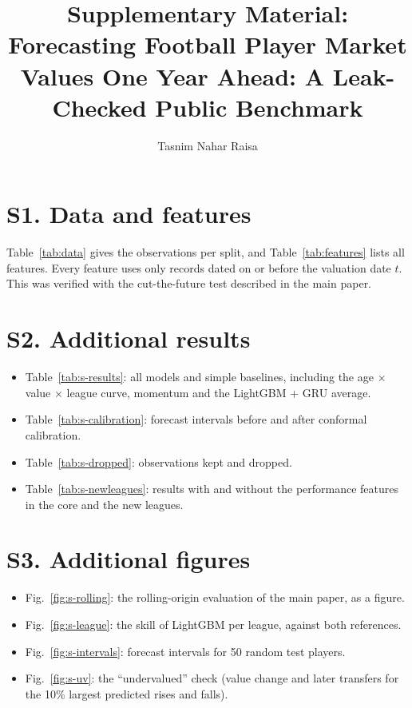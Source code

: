 \documentclass[conference,onecolumn]{IEEEtran}
\begin{document}
\title{Supplementary Material: Forecasting Football Player Market Values One Year Ahead: A Leak-Checked Public Benchmark}
\author{\ifanonymous\else Tasnim Nahar Raisa\fi}
\maketitle

\section*{S1. Data and features}
Table~\ref{tab:data} gives the observations per split, and Table~\ref{tab:features} lists all \NFeatures{} features. Every feature uses only records dated on or before the valuation date $t$. This was verified with the cut-the-future test described in the main paper.



\clearpage
\section*{S2. Additional results}
\begin{itemize}
\item Table~\ref{tab:s-results}: all models and simple baselines, including the age $\times$ value $\times$ league curve, momentum and the LightGBM + GRU average.
\item Table~\ref{tab:s-calibration}: forecast intervals before and after conformal calibration.
\item Table~\ref{tab:s-dropped}: observations kept and dropped.
\item Table~\ref{tab:s-newleagues}: results with and without the performance features in the core and the new leagues.
\end{itemize}





\clearpage
\section*{S3. Additional figures}
\begin{itemize}
\item Fig.~\ref{fig:s-rolling}: the rolling-origin evaluation of the main paper, as a figure.
\item Fig.~\ref{fig:s-league}: the skill of LightGBM per league, against both references.
\item Fig.~\ref{fig:s-intervals}: forecast intervals for 50 random test players.
\item Fig.~\ref{fig:s-uv}: the ``undervalued'' check (value change and later transfers for the 10\% largest predicted rises and falls).
\end{itemize}
\end{document}
